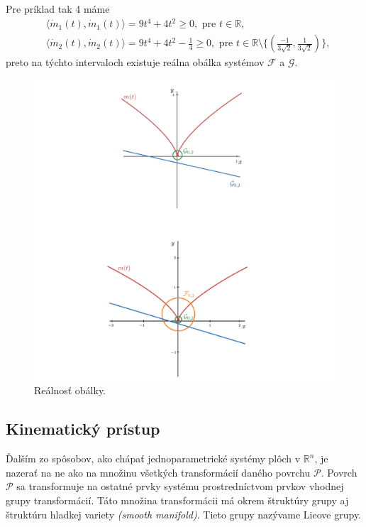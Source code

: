 Pre príklad tak 4 máme
\begin{align*}
&\langle \dot{m}_1(t), \dot{m}_1(t) \rangle = 9t^4 + 4t^2 \geq 0, \text{ pre } t \in \mathbb{R}, \\
&\langle \dot{m}_2(t), \dot{m}_2(t) \rangle = 9t^4 + 4t^2 - \frac{1}{4} \geq 0, \text{ pre } t \in \mathbb{R} \setminus \{ (\frac{-1}{3 \sqrt{2}}, \frac{1}{3 \sqrt{2}}) \},
\end{align*}
preto na týchto intervaloch existuje reálna obálka systémov $\mathcal{F}$ a $\mathcal{G}$.
\begin{figure}[h]
	\centering
	\includegraphics[trim={0cm 12cm 0cm 0cm},clip, width=\textwidth]{images/cyklograficke.pdf}
	\caption[Reálnosť obálky.]{Reálnosť obálky.}
	\label{fig:cykloraficke}
\end{figure}

\subsection{Kinematický prístup}
Ďalším zo spôsobov, ako chápať jednoparametrické systémy plôch v $\mathbb{R}^n$, je nazerať na ne ako na množinu všetkých transformácií daného povrchu $\mathcal{P}$. Povrch $\mathcal{P}$ sa transformuje na ostatné prvky systému prostredníctvom prvkov vhodnej grupy transformácií. Táto množina transformácii má okrem štruktúry grupy aj štruktúru hladkej variety \textit{(smooth manifold)}. Tieto grupy nazývame Lieove grupy.

